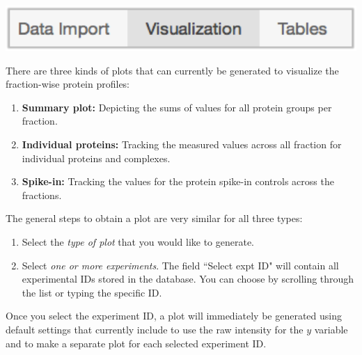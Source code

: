 \documentclass[letterpaper, twocolumn, 9pt]{article}
\begin{document}
\includegraphics[scale=.5]{figures/ss_appOverview02.png}

There are three kinds of plots that can currently be generated to visualize the fraction-wise protein profiles:

\begin{enumerate}
\item \textbf{Summary plot:} Depicting the sums of values for all protein groups per fraction.
\item \textbf{Individual proteins:} Tracking the measured values across all fraction for individual proteins and complexes.
\item \textbf{Spike-in:} Tracking the values for the protein spike-in controls across the fractions.
\end{enumerate}

The general steps to obtain a plot are very similar for all three types:

\begin{enumerate}[noitemsep]
\item Select the \textit{type of plot} that you would like to generate.
\item{Select \textit{one or more experiments}. The field \textsf{``Select expt ID"} will contain all experimental IDs stored in the database. You can choose by scrolling through the list or typing the specific ID.

}
\end{enumerate}

Once you select the experiment ID, a plot will immediately be generated using default settings that currently include to use the raw intensity for the $y$ variable and to make a separate plot for each selected experiment ID.
\end{document}
